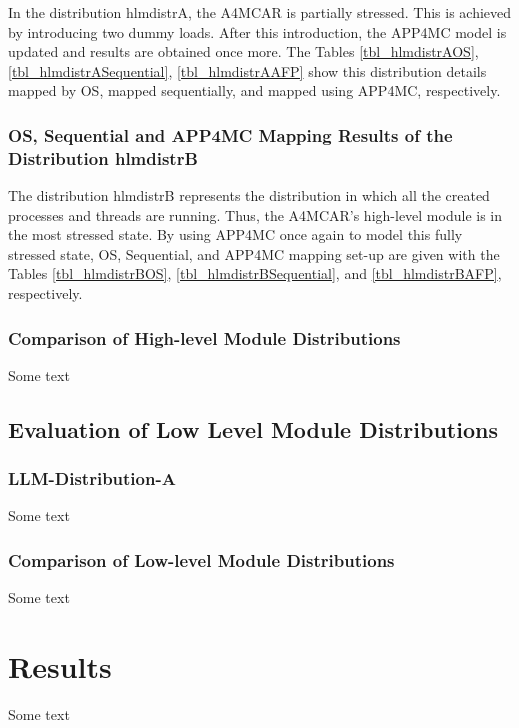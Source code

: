 In the distribution hlmdistrA, the A4MCAR is partially stressed. This is achieved by introducing two dummy loads. After this introduction, the APP4MC model is updated and results are obtained once more. The Tables \ref{tbl_hlmdistrAOS}, \ref{tbl_hlmdistrASequential}, \ref{tbl_hlmdistrAAFP} show this distribution details mapped by OS, mapped sequentially, and mapped using APP4MC, respectively.

\hlmdistrAOS

\hlmdistrASequential

\hlmdistrAAFP

\subsubsection{OS, Sequential and APP4MC Mapping Results of the Distribution hlmdistrB}

The distribution hlmdistrB represents the distribution in which all the created processes and threads are running. Thus, the A4MCAR's high-level module is in the most stressed state. By using APP4MC once again to model this fully stressed state, OS, Sequential, and APP4MC mapping set-up are given with the Tables \ref{tbl_hlmdistrBOS}, \ref{tbl_hlmdistrBSequential}, and \ref{tbl_hlmdistrBAFP}, respectively.

\hlmdistrBOS

\hlmdistrBSequential

\hlmdistrBAFP


\subsubsection{Comparison of High-level Module Distributions}
Some text
\hlcomparison

\subsection{Evaluation of Low Level Module Distributions}
\subsubsection{LLM-Distribution-A}
Some text
\llmdistrA

\subsubsection{Comparison of Low-level Module Distributions}
Some text
\llcomparison

\section{Results}
Some text \\

